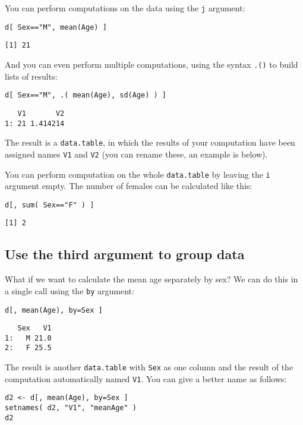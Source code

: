 \documentclass[11pt]{article}
\begin{document}
You can perform computations on the data using the \verb~j~ argument:
\lstset{language=R,label= ,caption= ,numbers=none}
\begin{lstlisting}
d[ Sex=="M", mean(Age) ]
\end{lstlisting}

\begin{verbatim}
[1] 21
\end{verbatim}

And you can even perform multiple computations, using the syntax \verb~.()~
to build lists of results:
\lstset{language=R,label= ,caption= ,numbers=none}
\begin{lstlisting}
d[ Sex=="M", .( mean(Age), sd(Age) ) ]
\end{lstlisting}

\begin{verbatim}
   V1       V2
1: 21 1.414214
\end{verbatim}

The result is a \verb~data.table~, in which the results of your computation
have been assigned names \verb~V1~ and \verb~V2~ (you can rename these, an
example is below).

You can perform computation on the whole \verb~data.table~ by leaving the
\verb~i~ argument empty. The number of females can be calculated like this:
\lstset{language=R,label= ,caption= ,numbers=none}
\begin{lstlisting}
d[, sum( Sex=="F" ) ]
\end{lstlisting}

\begin{verbatim}
[1] 2
\end{verbatim}

\subsection*{Use the third argument to group data}
\label{sec-2-4}

What if we want to calculate the mean age separately by sex? We can do
this in a single call using the \verb~by~ argument:
\lstset{language=R,label= ,caption= ,numbers=none}
\begin{lstlisting}
d[, mean(Age), by=Sex ]
\end{lstlisting}

\begin{verbatim}
   Sex   V1
1:   M 21.0
2:   F 25.5
\end{verbatim}

The result is another \verb~data.table~ with \verb~Sex~ as one column and the
result of the computation automatically named \verb~V1~. You can give a
better name as follows:
\lstset{language=R,label= ,caption= ,numbers=none}
\begin{lstlisting}
d2 <- d[, mean(Age), by=Sex ]
setnames( d2, "V1", "meanAge" )
d2
\end{lstlisting}
\end{document}
